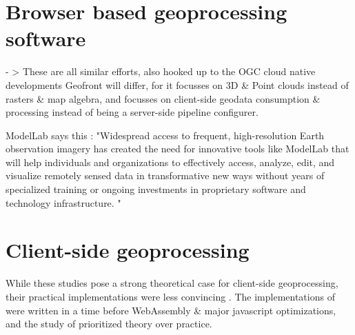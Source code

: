 




\section*{Browser based geoprocessing software}

- >
These are all similar efforts, also hooked up to the OGC cloud native developments
Geofront will differ, for it focusses on 3D \& Point clouds instead of rasters \& map algebra, and focusses on client-side geodata consumption \& processing instead of being a server-side pipeline configurer.

ModelLab says this : "Widespread access to frequent, high-resolution Earth observation imagery has created the need for innovative tools like ModelLab that will help individuals and organizations to effectively access, analyze, edit, and visualize remotely sensed data in transformative new ways without years of specialized training or ongoing investments in proprietary software and technology infrastructure. "



\section{Client-side geoprocessing}


While these studies pose a strong theoretical case for client-side geoprocessing, their practical implementations were less convincing . 
The implementations of \cite{panidi_hybrid_2015, hamilton_client-side_2014} were written in a time before WebAssembly \& major javascript optimizations, and the study of \cite{kulawiak_analysis_2019} prioritized theory over practice. 


